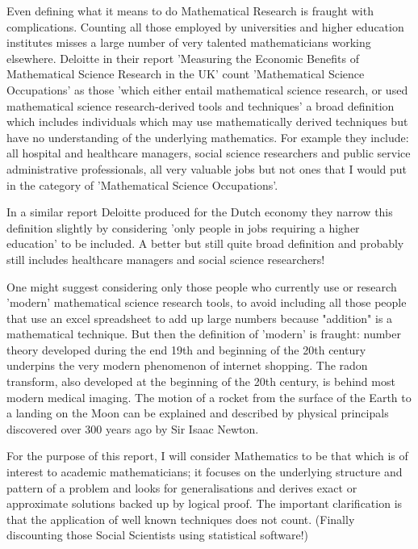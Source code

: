\documentclass[11pt]{article} %
\begin{document}
	Even defining what it means to do Mathematical Research is fraught with complications. Counting all those employed by universities and higher education institutes misses a large number of very talented mathematicians working elsewhere. 	Deloitte in their report 'Measuring the Economic Benefits of Mathematical Science Research in the UK' \cite{deloitteuk} count 'Mathematical Science Occupations' as those 'which either entail mathematical science research, or used mathematical science research-derived tools and techniques' a broad definition which includes individuals which may use mathematically derived techniques but have no understanding of the underlying mathematics. For example they include: all hospital and healthcare managers, social science researchers and public service administrative professionals, all very valuable jobs but not ones that I would put in the category of 'Mathematical Science Occupations'. 
	
	
	In a similar report Deloitte produced for the Dutch economy \cite{deloitteNL} they narrow this definition slightly by considering 'only people in jobs requiring a higher education' to be included.  A better but still quite broad definition and probably still includes healthcare managers and social science researchers!
	
	
	One might suggest considering only those people who currently use or research 'modern' mathematical science research tools, to avoid including all those people that use an excel spreadsheet to add up large numbers because "addition" is a mathematical technique. But then the definition of 'modern' is fraught: number theory developed during the end 19th and beginning of the 20th century underpins the very modern phenomenon of internet shopping. The radon transform, also developed at the beginning of the 20th century, is behind most modern medical imaging. The motion of a rocket from the surface of the Earth to a landing on the Moon can be explained and described by physical principals discovered over 300 years ago by Sir Isaac Newton.
	
	
	For the purpose of this report, I  will consider Mathematics to be that which is of interest to academic mathematicians; it focuses  on the underlying structure and pattern of a problem and  looks for generalisations and derives exact or approximate solutions backed up by logical proof. The important clarification is that the application of well known techniques does not count. (Finally discounting those Social Scientists using statistical software!)
	
\end{document}
